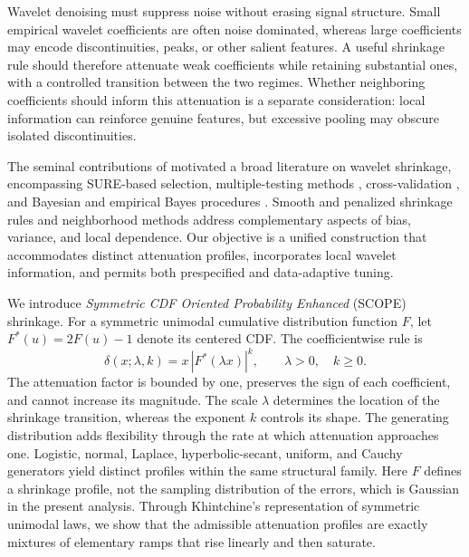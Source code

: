\documentclass[12pt]{article}
\theoremstyle{definition}
\theoremstyle{definition}
\begin{document}
Wavelet denoising must suppress noise without erasing signal structure.
Small empirical wavelet coefficients are often noise dominated, whereas
large coefficients may encode discontinuities, peaks, or other salient
features. A useful shrinkage rule should therefore attenuate weak
coefficients while retaining substantial ones, with a controlled
transition between the two regimes. Whether neighboring coefficients
should inform this attenuation is a separate consideration: local
information can reinforce genuine features, but excessive pooling
may obscure isolated discontinuities.

The seminal contributions of
\citet{DonohoJohnstone1994,DonohoJohnstone1995} motivated a broad
literature on wavelet shrinkage, encompassing SURE-based selection,
multiple-testing methods \citep{AbramovichBenjamini1996},
cross-validation \citep{Nason1996}, and Bayesian and empirical Bayes
procedures \citep{Vidakovic1998,VidakovicRuggeri2001,ChipmanKolaczykMcCulloch1997,
JohnstoneSilverman2005EBayes}. Smooth and penalized shrinkage rules
\citep{AntoniadisFan2001,FanLi2001,GaoBruce1997,Gao1998,
AttoPastorMercier2008} and neighborhood methods
\citep{CaiSilverman2001Neigh} address complementary aspects of
bias, variance, and local dependence. Our objective is a unified
construction that accommodates distinct attenuation profiles,
incorporates local wavelet information, and permits both prespecified
and data-adaptive tuning.

We introduce \emph{Symmetric CDF Oriented Probability Enhanced} (SCOPE)
shrinkage. For a symmetric unimodal cumulative distribution function
$F$, let $F^*(u)=2F(u)-1$ denote its centered CDF. The coefficientwise
rule is
\begin{equation}
\delta(x;\lambda,k)=x\,|F^*(\lambda x)|^k,
\qquad \lambda>0,\quad k\geq0.
\label{eq:scope-intro}
\end{equation}
The attenuation factor is bounded by one, preserves the sign of each
coefficient, and cannot increase its magnitude. The scale $\lambda$
determines the location of the shrinkage transition, whereas the
exponent $k$ controls its shape. The generating distribution adds
flexibility through the rate at which attenuation approaches one.
Logistic, normal, Laplace, hyperbolic-secant, uniform, and Cauchy
generators yield distinct profiles within the same structural family.
Here $F$ defines a shrinkage profile, not the sampling distribution
of the errors, which is Gaussian in the present analysis.
Through Khintchine's representation of symmetric unimodal laws, we show
that the admissible attenuation profiles are exactly mixtures of
elementary ramps that rise linearly and then saturate.
\end{document}
